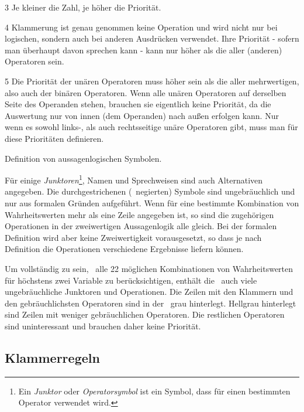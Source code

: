 \begin{table}
\begin{threeparttable}
\begin{tablenotes}
			\item[3] Je kleiner die Zahl, je höher die Priorität.

			\item[4] Klammerung ist genau genommen keine Operation und wird nicht nur bei logischen, sondern auch bei anderen Ausdrücken verwendet. Ihre Priorität - sofern man überhaupt davon sprechen kann - kann nur höher als die aller (anderen) Operatoren sein.

			\item[5] Die Priorität der unären Operatoren muss höher sein als die aller mehrwertigen, also auch der binären Operatoren.
			Wenn alle unären Operatoren auf derselben Seite des Operanden stehen, brauchen sie eigentlich keine Priorität, da die Auswertung nur von innen (dem Operanden) nach außen erfolgen kann.
			Nur wenn es sowohl links-, als auch rechtsseitige unäre Operatoren gibt, muss man für diese Prioritäten definieren.

		\end{tablenotes}
	\end{threeparttable}
	\caption{Definition von aussagenlogischen Symbolen.}
	\label{tab:Symbole}%
\end{table}

Für einige \emph{Junktoren}\footnote{Ein \emph{Junktor} oder \emph{Operatorsymbol} ist ein Symbol, dass für einen bestimmten Operator verwendet wird.}, Namen und Sprechweisen sind auch Alternativen angegeben.
Die durchgestrichenen (\textdh\ negierten) Symbole sind ungebräuchlich und nur aus formalen Gründen aufgeführt.
Wenn für eine bestimmte Kombination von Wahrheitswerten mehr als eine Zeile angegeben ist, so sind die zugehörigen Operationen in der zweiwertigen Aussagenlogik alle gleich.
Bei der formalen Definition wird aber keine Zweiwertigkeit vorausgesetzt, so dass je nach Definition die Operationen verschiedene Ergebnisse liefern können.

Um vollständig zu sein, \textdh\ alle 22 möglichen Kombinationen von Wahrheitswerten für höchstens zwei Variable zu berücksichtigen, enthält die \tablename\ auch viele ungebräuchliche Junktoren und Operationen.
Die Zeilen mit den Klammern und den gebräuchlichsten Operatoren sind in der \tablename\ grau hinterlegt.
Hellgrau hinterlegt sind Zeilen mit weniger gebräuchlichen Operatoren.
Die restlichen Operatoren sind uninteressant und brauchen daher keine Priorität.

\subsection{Klammerregeln}%
\label{sub:Klammerregeln}

